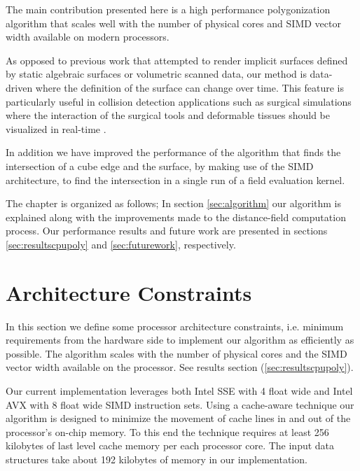 The main contribution presented here is a high performance polygonization algorithm that scales well with the 
number of physical cores and SIMD vector width available on modern processors.

As opposed to previous work that attempted to render implicit surfaces defined by static algebraic surfaces or 
volumetric scanned data, our method is data-driven where the definition of the surface can change over time. This feature 
is particularly useful in collision detection applications such as surgical simulations where the interaction
of the surgical tools and deformable tissues should be visualized in real-time \cite{Laycock2007}. 
 
In addition we have improved the performance of the algorithm that finds the intersection of a cube edge and the surface, by making use of the SIMD architecture, 
to find the intersection in a single run of a field evaluation kernel.


The chapter is organized as follows;  In section \ref{sec:algorithm} our algorithm is explained along with 
the improvements made to the distance-field computation process. Our performance results and future 
work are presented in sections \ref{sec:resultscpupoly} and \ref{sec:futurework}, respectively.

\section{Architecture Constraints}\label{sec:architecture}
In this section we define some processor architecture constraints, i.e. minimum 
requirements from the hardware side to implement our algorithm as efficiently as possible.
The algorithm scales with the number of physical cores and the SIMD vector width available on the processor.  
See results section (\ref{sec:resultscpupoly}). 

Our current implementation leverages both Intel SSE with 4 float wide and Intel AVX with 8 float wide SIMD instruction sets.
Using a cache-aware technique our algorithm is designed to minimize the movement of cache lines in and out of the processor's on-chip 
memory. To this end the technique requires at least 256 kilobytes of last level cache memory per each processor core. 
The input data structures take about 192 kilobytes of memory in our implementation.

